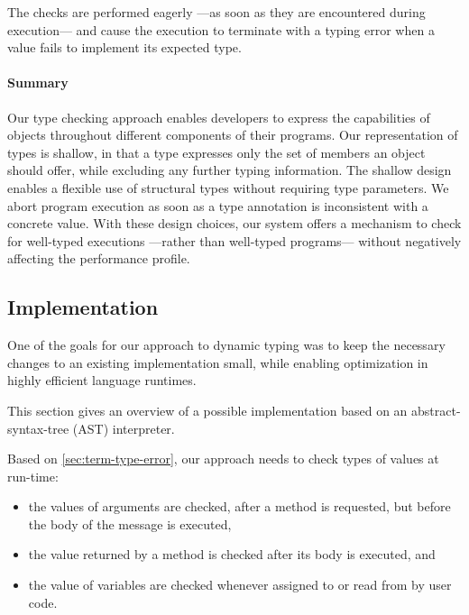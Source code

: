 The checks are performed eagerly%
---as soon as they are encountered during execution---%
and cause the execution to terminate with a typing error 
when a value fails to implement its expected type.

\paragraph{Summary}
Our type checking approach enables developers to express
the capabilities of objects throughout different components of 
their programs.
Our representation of types is shallow,
in that a type expresses only the set of members an object
should offer, while excluding any further typing information. 
The shallow design enables a flexible use of structural types without
requiring type parameters.
We abort program execution as soon as
a type annotation is inconsistent with a concrete value. 
With these design choices, our system offers a
mechanism to check for well-typed executions%
---rather than well-typed programs---%
without negatively affecting the performance profile.

\subsection{Implementation} 
\label{ssec:implementation} 

One of the goals for our approach to dynamic typing was to keep
the necessary changes to an existing implementation small,
while enabling optimization in highly efficient language runtimes.

This section gives an overview of a possible implementation
based on an abstract-syntax-tree (AST) interpreter.

Based on \cref{sec:term-type-error},
our approach needs to check types of values at run-time:

\begin{itemize}
\item the values of arguments are checked, after a method is requested, 
      but before the body of the message is executed,
\item the value returned by a method is checked after its body is executed, and
\item the value of variables are checked
      whenever assigned to or read from by user code.
\end{itemize}

